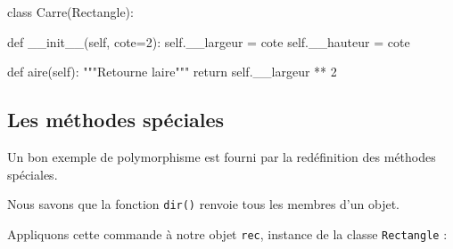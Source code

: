 \documentclass[
  letterpaper,
  DIV=11,
  numbers=noendperiod]{scrartcl}
\newenvironment{Shaded}{\begin{snugshade}}{\end{snugshade}}
\newcommand{\CommentTok}[1]{\textcolor[rgb]{0.37,0.37,0.37}{#1}}
\newcommand{\ControlFlowTok}[1]{\textcolor[rgb]{0.00,0.23,0.31}{#1}}
\newcommand{\DecValTok}[1]{\textcolor[rgb]{0.68,0.00,0.00}{#1}}
\newcommand{\FunctionTok}[1]{\textcolor[rgb]{0.28,0.35,0.67}{#1}}
\newcommand{\KeywordTok}[1]{\textcolor[rgb]{0.00,0.23,0.31}{#1}}
\newcommand{\NormalTok}[1]{\textcolor[rgb]{0.00,0.23,0.31}{#1}}
\newcommand{\OperatorTok}[1]{\textcolor[rgb]{0.37,0.37,0.37}{#1}}
\newcommand{\VariableTok}[1]{\textcolor[rgb]{0.07,0.07,0.07}{#1}}
\begin{document}
\begin{Shaded}
\begin{Highlighting}[]
\KeywordTok{class}\NormalTok{ Carre(Rectangle):}

    \KeywordTok{def} \FunctionTok{\_\_init\_\_}\NormalTok{(}\VariableTok{self}\NormalTok{, cote}\OperatorTok{=}\DecValTok{2}\NormalTok{):}
        \VariableTok{self}\NormalTok{.\_\_largeur }\OperatorTok{=}\NormalTok{ cote}
        \VariableTok{self}\NormalTok{.\_\_hauteur }\OperatorTok{=}\NormalTok{ cote}
    
    \KeywordTok{def}\NormalTok{ aire(}\VariableTok{self}\NormalTok{):}
        \CommentTok{"""Retourne l\textquotesingle{}aire"""}
        \ControlFlowTok{return} \VariableTok{self}\NormalTok{.\_\_largeur }\OperatorTok{**} \DecValTok{2}
\end{Highlighting}
\end{Shaded}

\hypertarget{les-muxe9thodes-spuxe9ciales}{%
\subsection{Les méthodes spéciales}\label{les-muxe9thodes-spuxe9ciales}}

Un bon exemple de polymorphisme est fourni par la redéfinition des
méthodes spéciales.

Nous savons que la fonction \texttt{dir()} renvoie tous les membres d'un
objet.

Appliquons cette commande à notre objet \texttt{rec}, instance de la
classe \texttt{Rectangle} :
\end{document}
